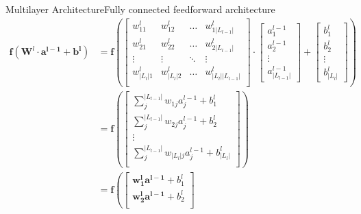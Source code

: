 \documentclass{beamer}
\begin{document}
\begin{frame}{Multilayer Architecture}{Fully connected feedforward architecture}
                {\tiny
                \begin{align*}
                    \mathbf{f}\left( \mathbf{W}^l \cdot \mathbf{a^{l-1}} + \mathbf{b^l} \right) &=
                    \mathbf{f} \left( \begin{bmatrix}
                        w^l_{11} & w^l_{12} & \ldots & w^l_{1|L_{l-1}|}\\
                        w^l_{21} & w^l_{22} & \ldots & w^l_{2|L_{l-1}|}\\
                        \vdots & \vdots & \ddots & \vdots\\
                        w^l_{|L_l|1} & w^l_{|L_l|2} & \ldots & w^l_{|L_l||L_{l-1}|}\\
                    \end{bmatrix}
                    \cdot
                    \begin{bmatrix}
                        a^{l-1}_1 \\ a^{l-1}_2  \\ \vdots  \\ a^{l-1}_{|L_{l-1}|}
                    \end{bmatrix}
                    +
                    \begin{bmatrix}
                        b^{l}_1 \\ b^{l}_2  \\ \vdots  \\ b^{l}_{|L_l|}
                    \end{bmatrix}
                    \right)\\
                    & =
                    \mathbf{f}\left( \begin{bmatrix}
                        \sum_j^{|L_{l-1}|} w_{1j}a^{l-1}_j + b^l_1\\
                        \sum_j^{|L_{l-1}|} w_{2j}a^{l-1}_j + b^l_2\\
                        \vdots\\
                        \sum_j^{|L_{l-1}|} w_{|L_l|j}a^{l-1}_j + b^l_{|L_l|}\\
                    \end{bmatrix} \right)\\
                    & = 
                    \mathbf{f} \left( \begin{bmatrix}
                        \mathbf{w^l_1}\mathbf{a^{l-1}} + b^l_1\\
                        \mathbf{w^l_2}\mathbf{a^{l-1}} + b^l_2\\

\end{bmatrix}
\end{align*}}
\end{frame}
\end{document}
